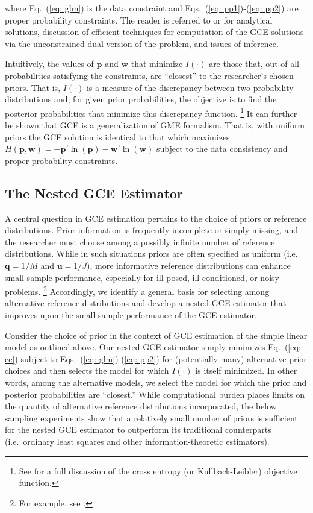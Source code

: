 \documentclass[english]{article}
\begin{document}
\noindent
where Eq.\ (\ref{eq: glm}) is the data constraint and Eqs.\ 
(\ref{eq: pp1})-(\ref{eq: pp2}) are proper probability constraints.
The reader is referred to \citet[Chap.\ 6]{golan1996} or 
\citet[Chap.\ 6]{golan2008} for analytical solutions, discussion of 
efficient techniques for computation of the GCE solutions via the 
unconstrained dual version of the problem, and issues of inference. 

Intuitively, the values of $\mathbf{p}$ and $\mathbf{w}$ that minimize
$I(\cdot)$ are those that, out of all probabilities satisfying the constraints, 
are ``closest'' to the researcher's chosen priors.
That is, $I(\cdot)$ is a measure of the discrepancy between two probability 
distributions and, for given prior probabilities, the objective is to find the 
posterior probabilities that minimize this discrepancy function.%
\footnote{See \citet[Chap.\ 6]{judge2011} for a full discussion of the 
cross entropy (or Kullback-Leibler) objective function.}
It can further be shown that GCE is a generalization of GME formalism.
That is, with uniform priors the GCE solution is identical to that which 
maximizes $H(\mathbf{p},\mathbf{w}) = - \mathbf{p}' \ln 
(\mathbf{p}) - \mathbf{w}' \ln (\mathbf{w})$ subject to the data
consistency and proper probability constraints. 

\subsection{The Nested GCE Estimator}

A central question in GCE estimation pertains to the choice of 
priors or reference distributions.
Prior information is frequently incomplete or simply missing, and 
the researcher must choose among a possibly infinite number of 
reference distributions. 
While in such situations priors are often specified as uniform (i.e.\ 
$\mathbf{q}=1/M$ and $\mathbf{u}=1/J$), more informative 
reference distributions can enhance small sample performance, especially 
for ill-posed, ill-conditioned, or noisy problems.%
\footnote{For example, see \citet{heckelei2003}.}
Accordingly, we identify a general basis for selecting among alternative 
reference distributions and develop a nested GCE estimator that improves 
upon the small sample performance of the GCE estimator. 

Consider the choice of prior in the context of GCE estimation of the simple 
linear model as outlined above.
Our nested GCE estimator simply minimizes Eq.\ (\ref{eq: ce}) subject to 
Eqs.\ (\ref{eq: glm})-(\ref{eq: pp2}) for (potentially many) alternative prior 
choices and then selects the model for which $I(\cdot)$ is itself minimized.
In other words, among the alternative models, we select the model for which the 
prior and posterior probabilities are ``closest.''
While computational burden places limits on the quantity of alternative 
reference distributions incorporated, the below sampling experiments show 
that a relatively small number of priors is sufficient for the nested GCE 
estimator to outperform its traditional counterparts (i.e.\ ordinary least 
squares and other information-theoretic estimators).
\end{document}
